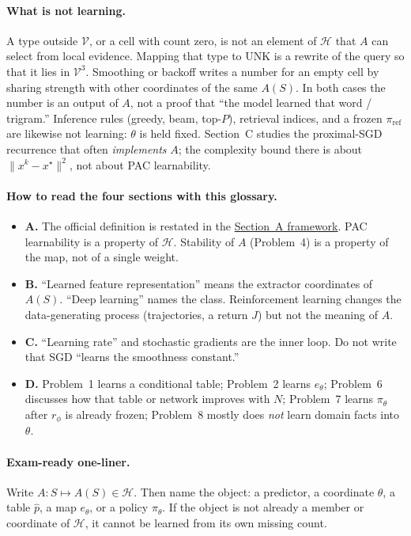 \documentclass[11pt,a4paper]{article}
\newcommand{\jump}[2]{\hyperref[#1]{#2}}
\theoremstyle{definition}
\begin{document}
\paragraph{What is not learning.}
A type outside \(\mathcal{V}\), or a cell with count zero, is not an element of \(\mathcal{H}\) that \(A\) can select from local evidence. Mapping that type to \(\mathrm{UNK}\) is a rewrite of the query so that it lies in \(\mathcal{V}^3\). Smoothing or backoff writes a number for an empty cell by sharing strength with other coordinates of the same \(A(S)\). In both cases the number is an output of \(A\), not a proof that ``the model learned that word / trigram.'' Inference rules (greedy, beam, top-\(P\)), retrieval indices, and a frozen \(\pi_{\mathrm{ref}}\) are likewise not learning: \(\theta\) is held fixed. Section~C studies the proximal-SGD recurrence that often \emph{implements} \(A\); the complexity bound there is about \(\|x^k-x^\star\|^2\), not about PAC learnability.

\paragraph{How to read the four sections with this glossary.}
\begin{itemize}
    \item \textbf{A.} The official definition is restated in the \jump{sec:spr2025-a-framework}{Section~A framework}. PAC learnability is a property of \(\mathcal{H}\). Stability of \(A\) (Problem~4) is a property of the map, not of a single weight.
    \item \textbf{B.} ``Learned feature representation'' means the extractor coordinates of \(A(S)\). ``Deep learning'' names the class. Reinforcement learning changes the data-generating process (trajectories, a return \(J\)) but not the meaning of \(A\).
    \item \textbf{C.} ``Learning rate'' and stochastic gradients are the inner loop. Do not write that SGD ``learns the smoothness constant.''
    \item \textbf{D.} Problem~1 learns a conditional table; Problem~2 learns \(e_\theta\); Problem~6 discusses how that table or network improves with \(N\); Problem~7 learns \(\pi_\theta\) after \(r_\phi\) is already frozen; Problem~8 mostly does \emph{not} learn domain facts into \(\theta\).
\end{itemize}

\paragraph{Exam-ready one-liner.}
Write \(A:S\mapsto A(S)\in\mathcal{H}\). Then name the object: a predictor, a coordinate \(\theta\), a table \(\widehat p\), a map \(e_\theta\), or a policy \(\pi_\theta\). If the object is not already a member or coordinate of \(\mathcal{H}\), it cannot be learned from its own missing count.
\end{document}
